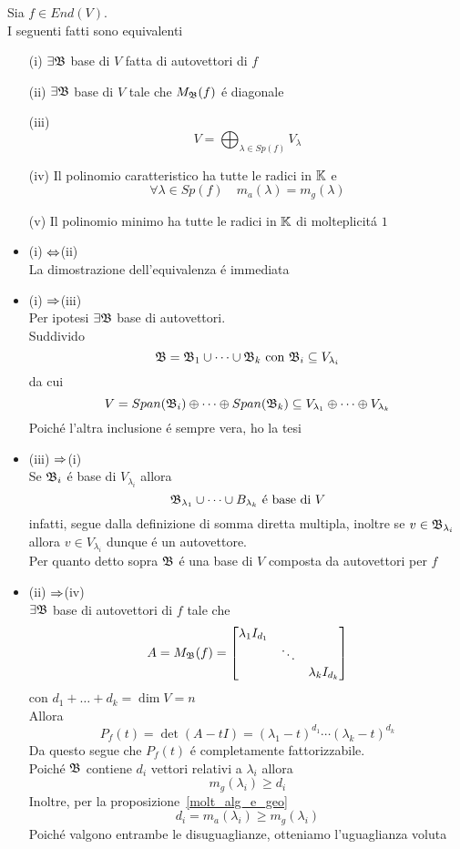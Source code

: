 \begin{prop} Sia $f \in End(V)$.\\
I seguenti fatti sono equivalenti
\begin{itemize}
\item[(i)] $\exists \mathfrak{B}$ base di $V$ fatta di autovettori  di $f$
\item[(ii)]$\exists \mathfrak{B}$ base di $V$ tale che $M_{\mathfrak{B}}(f)$ \'e diagonale
\item[(iii)]$$V= \bigoplus_{\lambda \in Sp(f)} V_\lambda$$
\item[(iv)] Il polinomio caratteristico ha tutte le radici in $\mathbb{K}$ e
$$ \forall \lambda \in Sp(f) \quad  m_a(\lambda)=m_g(\lambda)$$
\item[(v)]Il polinomio minimo ha tutte le radici in $\mathbb{K}$ di molteplicit\'a $1$

\end{itemize}
\proof \bianco
\begin{itemize}
\item(i) $\Leftrightarrow $(ii)\\ 
La dimostrazione dell'equivalenza \'e immediata
\item (i) $\Rightarrow $(iii)\\
Per ipotesi  $\exists \mathfrak{B}$ base di autovettori.\\
Suddivido $$\mathfrak{B}=\mathfrak{B}_1 \cup \dots \cup \mathfrak{B}_k \text{ con }\mathfrak{B}_i \subseteq V_{\lambda_i} $$ da cui
$$ V= Span(\mathfrak{B}_i) \oplus \dots \oplus Span(\mathfrak{B}_k) \subseteq V_{\lambda_1} \oplus \dots \oplus V_{\lambda_k}$$
Poich\'e l'altra inclusione \'e sempre vera, ho la tesi
 \item(iii) $\Rightarrow $(i)\\
  Se $\mathfrak{B}_i$ \'e base di $ V_{\lambda_i} $ allora 
 $$\mathfrak{B}_{\lambda_1} \cup \dots \cup B_{\lambda_k} \text{ \'e base di  } V $$
infatti, segue dalla definizione di somma diretta multipla, inoltre se $ v \in \mathfrak{B}_{\lambda_i}$ allora $v\in V_{\lambda_i}$ dunque \'e un autovettore.\\
Per quanto detto sopra $\mathfrak{B}$ \'e una base di $V$ composta da autovettori per $f$
\item(ii) $\Rightarrow $(iv)\\
  $\exists \mathfrak{B}$ base di autovettori di $f$ tale che 
$$A= M_{\mathfrak{B}}(f)= \begin{bmatrix}\lambda_1 I_{d_{1}}  & & \\ & \ddots & \\ & &  \lambda_k I_{d_{k}}
\end{bmatrix}$$ 
con $d_{1} + \dots + d_{k}=\dim V=n $\\
Allora 
$$P_f(t) = \det (A-tI)=(\lambda_1 -t ) ^{d_{1}} \cdots (\lambda_k -t ) ^{d_{k}}$$
Da questo segue che $P_f(t)$ \'e completamente fattorizzabile.\\
Poich\'e $\mathfrak{B}$ contiene $d_{i} $ vettori relativi a $\lambda_i$ allora $$m_g(\lambda_i) \geq d_{i}$$
Inoltre, per la proposizione~\ref{molt_alg_e_geo}
 $$d_i=m_a(\lambda_i) \geq m_g({\lambda_i})$$
 Poich\'e valgono entrambe le disuguaglianze, otteniamo l'uguaglianza voluta
 

\end{itemize}
\end{prop}
